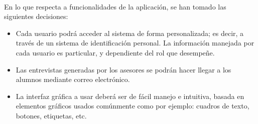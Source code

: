 \paragraph{}En lo que respecta a funcionalidades de la aplicación, se han tomado
las siguientes decisiones:

\begin{itemize}
   \item Cada usuario podrá acceder al sistema de forma personalizada; es decir,
   a través de un sistema de identificación personal. La información manejada
   por cada usuario es particular, y dependiente del rol que desempeñe.
   \item Las entrevistas generadas por los asesores se podrán hacer llegar a los
   alumnos mediante correo electrónico.
   \item La interfaz gráfica a usar deberá ser de fácil manejo e intuitiva,
   basada en elementos gráficos usados comúnmente como por ejemplo: cuadros de
   texto, botones, etiquetas, etc.
\end{itemize}

